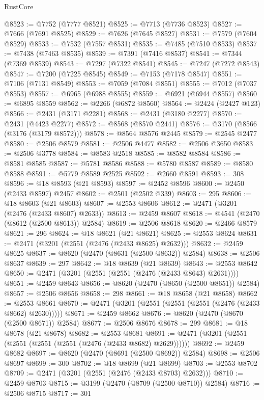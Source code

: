 \begin{lexlean}{RustCore}
\begin{coremodule}
@8523 := @7752 (@7777 @8521)
@8525 := @7713 (@7736 @8523)
@8527 := @7666 (@7691 @8525)
@8529 := @7626 (@7645 @8527)
@8531 := @7579 (@7604 @8529)
@8533 := @7532 (@7557 @8531)
@8535 := @7485 (@7510 @8533)
@8537 := @7438 (@7463 @8535)
@8539 := @7391 (@7416 @8537)
@8541 := @7344 (@7369 @8539)
@8543 := @7297 (@7322 @8541)
@8545 := @7247 (@7272 @8543)
@8547 := @7200 (@7225 @8545)
@8549 := @7153 (@7178 @8547)
@8551 := @7106 (@7131 @8549)
@8553 := @7059 (@7084 @8551)
@8555 := @7012 (@7037 @8553)
@8557 := @6965 (@6988 @8555)
@8559 := @6921 (@6944 @8557)
@8560 := @6895 @8559
@8562 := @2266 (@6872 @8560)
@8564 := @2424 (@2427 @123)
@8566 := @2431 (@3171 @2281)
@8568 := @2431 (@3180 @2277)
@8570 := @2431 (@4423 @2277)
@8572 := @8568 (@8570 @2441)
@8576 := @3170 (@8566 (@3176 (@3179 @8572)))
@8578 := @8564 @8576 @2445
@8579 := @2545 @2477
@8580 := @2506 @8579
@8581 := @2506 @4477
@8582 := @2506 @3650
@8583 := @2506 @3778
@8584 := @8583 @2518
@8585 := @8582 @8584
@8586 := @8581 @8585
@8587 := @5781 @8586
@8588 := @5780 @8587
@8589 := @8580 @8588
@8591 := @5779 @8589 @2525
@8592 := @2660 @8591
@8593 := 308
@8596 := @18 @8593 (@21 @8593)
@8597 := @2452 @8596
@8600 := @2450 (@2433 @8597) @2457
@8602 := @2501 (@2502 @339)
@8603 := 295
@8606 := @18 @8603 (@21 @8603)
@8607 := @2553 @8606
@8612 := @2471 (@3201 (@2476 (@2433 @8607) @2633))
@8613 := @2459 @8607
@8618 := @4541 (@2470 (@8612 (@2500 @8613)) @2584)
@8619 := @2506 @8618
@8620 := @2466 @8579
@8621 := 296
@8624 := @18 @8621 (@21 @8621)
@8625 := @2553 @8624
@8631 := @2471 (@3201 (@2551 (@2476 (@2433 @8625) @2632)))
@8632 := @2459 @8625
@8637 := @8620 (@2470 (@8631 (@2500 @8632)) @2584)
@8638 := @2506 @8637
@8639 := 297
@8642 := @18 @8639 (@21 @8639)
@8643 := @2553 @8642
@8650 := @2471 (@3201 (@2551 (@2551 (@2476 (@2433 @8643) @2631))))
@8651 := @2459 @8643
@8656 := @8620 (@2470 (@8650 (@2500 @8651)) @2584)
@8657 := @2506 @8656
@8658 := 298
@8661 := @18 @8658 (@21 @8658)
@8662 := @2553 @8661
@8670 := @2471 (@3201 (@2551 (@2551 (@2551 (@2476 (@2433 @8662) @2630)))))
@8671 := @2459 @8662
@8676 := @8620 (@2470 (@8670 (@2500 @8671)) @2584)
@8677 := @2506 @8676
@8678 := 299
@8681 := @18 @8678 (@21 @8678)
@8682 := @2553 @8681
@8691 := @2471 (@3201 (@2551 (@2551 (@2551 (@2551 (@2476 (@2433 @8682) @2629))))))
@8692 := @2459 @8682
@8697 := @8620 (@2470 (@8691 (@2500 @8692)) @2584)
@8698 := @2506 @8697
@8699 := 300
@8702 := @18 @8699 (@21 @8699)
@8703 := @2553 @8702
@8709 := @2471 (@3201 (@2551 (@2476 (@2433 @8703) @2632)))
@8710 := @2459 @8703
@8715 := @3199 (@2470 (@8709 (@2500 @8710)) @2584)
@8716 := @2506 @8715
@8717 := 301

\end{coremodule}
\end{lexlean}
